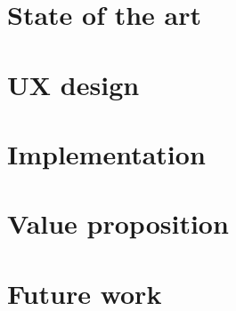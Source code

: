 \documentclass[letterpaper,12pt]{article}
\begin{document}
\section{State of the art}
	
	\pagebreak
	
\section{UX design}
	
	\pagebreak
	
\section{Implementation}
	
	\pagebreak
	
\section{Value proposition}
	
	\pagebreak

\section{Future work}
	
	\pagebreak


\end{document}
